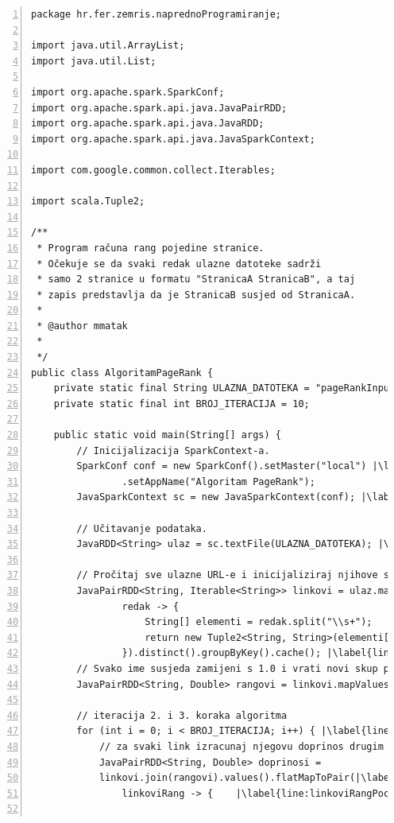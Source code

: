 \documentclass[times, utf8, zavrsni, numeric]{fer}
\begin{document}
\vspace{5mm}
\begin{lstlisting}[numbers=left, label={lst:pagerank}, caption={Algoritam \emph{PageRank}.}, escapechar=|]
package hr.fer.zemris.naprednoProgramiranje;

import java.util.ArrayList;
import java.util.List;

import org.apache.spark.SparkConf;
import org.apache.spark.api.java.JavaPairRDD;
import org.apache.spark.api.java.JavaRDD;
import org.apache.spark.api.java.JavaSparkContext;

import com.google.common.collect.Iterables;

import scala.Tuple2;

/**
 * Program računa rang pojedine stranice. 
 * Očekuje se da svaki redak ulazne datoteke sadrži 
 * samo 2 stranice u formatu "StranicaA StranicaB", a taj
 * zapis predstavlja da je StranicaB susjed od StranicaA.
 * 
 * @author mmatak
 *
 */
public class AlgoritamPageRank {
	private static final String ULAZNA_DATOTEKA = "pageRankInput.txt";
	private static final int BROJ_ITERACIJA = 10;

	public static void main(String[] args) {
		// Inicijalizacija SparkContext-a.
		SparkConf conf = new SparkConf().setMaster("local") |\label{line:initStart}|
				.setAppName("Algoritam PageRank");
		JavaSparkContext sc = new JavaSparkContext(conf); |\label{line:initEnd}|

		// Učitavanje podataka.
		JavaRDD<String> ulaz = sc.textFile(ULAZNA_DATOTEKA); |\label{line:ucitavanje}|

		// Pročitaj sve ulazne URL-e i inicijaliziraj njihove susjede.
		JavaPairRDD<String, Iterable<String>> linkovi = ulaz.mapToPair(|\label{line:susjediInitStart}|
				redak -> {
					String[] elementi = redak.split("\\s+");
					return new Tuple2<String, String>(elementi[0], elementi[1]);
				}).distinct().groupByKey().cache(); |\label{line:susjediInitEnd}|
		// Svako ime susjeda zamijeni s 1.0 i vrati novi skup podataka.
		JavaPairRDD<String, Double> rangovi = linkovi.mapValues(value -> 1.0); |\label{line:initRangovi}|

		// iteracija 2. i 3. koraka algoritma
		for (int i = 0; i < BROJ_ITERACIJA; i++) { |\label{line:brIteracijaStart}|
			// za svaki link izracunaj njegovu doprinos drugim linkovima
			JavaPairRDD<String, Double> doprinosi =
			linkovi.join(rangovi).values().flatMapToPair(|\label{line:joinValues}|
				linkoviRang -> { 	|\label{line:linkoviRangPocetak}|
			

\end{lstlisting}
\end{document}
